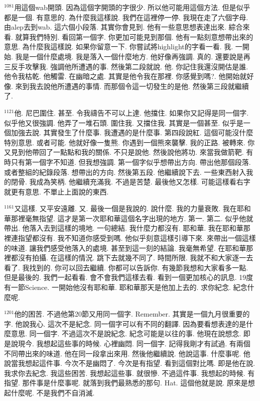 \documentclass{book}
\begin{document}
$^{1081}$用這個wab開頭.
因為這個字開頭的字很少.
所以他可能用這個方法.
但是似乎都是一個.
有意思的.
為什麼我這樣說.
我們在這裡停一停.
我現在走了六個字母.
由alep去到wab.
這六個小段落.
其實你會見到.
他有一些意思想表達出來.
綜合來看.
就算我們特別.
看回第一個字.
你更加可能見到那個.
他有一點刻意想帶出來的意思.
為什麼我這樣說.
如果你留意一下.
你嘗試將highlight的字看一看.
我.
一開始.
我是一個什麼處境.
我是落入一個什麼地方.
他好像再強調.
真的.
還要說是再三反手攻擊我.
強調他所遭遇的事.
然後第二段就說.
他.
你記住我還沒開估是誰.
他令我枯乾.
他觸雷.
在幽暗之處.
其實是他令我在那裡.
你感覺到嗎?.
他開始就好像.
來到我去說他所遭遇的事情.
而那個令這一切發生的是他.
然後第三段就繼續了.

$^{1121}$他.
尼巴圍住.
甚至.
令我禱告不可以上達.
他擋住.
如果你又記得是同一個字.
似乎他又很強調.
他弄了一堆石頭.
圍住我.
又擋住我.
其實是一個甚至.
似乎是一個加強去說.
其實發生了什麼事.
我遭遇的是什麼事.
第四段說紅.
這個可能沒什麼特別意思.
或者可能.
他就好像一隻熊.
你遇到一個熊來襲擊.
我的正路.
被轉來.
你又見到他帶回了一點點和我的關係.
不只是說他.
然後說他將功.
來當我做箭靶.
有時只有第一個字不知道.
但我想強調.
第一個字似乎想帶出方向.
帶出他那個段落.
或者整組的紀錄段落.
想帶出的方向.
然後第五段.
他繼續說下去.
一些東西射入我的閉骨.
我成為笑柄.
他繼續充滿我.
不過是苦楚.
最後他又怎樣.
可能這樣看右字就更有意思.
不單止上面說的東西.

$^{1161}$又這樣.
又平安遠離.
又.
最後一個是我說的.
說什麼.
我的力量衰敗.
我在耶和華那裡毫無指望.
這才是第一次耶和華這個名字出現的地方.
第一.
第二.
似乎他就帶出.
他落入去到這樣的境地.
一句總結.
我什麼力都沒有.
耶和華.
我在耶和華那裡連指望都沒有.
我不知道你感受到嗎.
他似乎刻意這樣引導下來.
來帶出一個這樣的味道.
讓我們感受他落入的處境.
甚至到這一刻的結論.
我毫無希望.
在耶和華那裡都沒有拍攝.
在這樣的情況.
跳下去就幾不同了.
時間所限.
我就不和大家逐一去看了.
我找到的.
你可以回去繼續.
你都可以告訴你.
有幾節我想和大家看多一點.
但是最後的.
我們一起看看.
會不會我們這樣去看.
看到一個更加核心的訊息.
19度有一節Science.
一開始他沒有耶和華.
耶和華那天是他加上去的.
求你紀念.
紀念什麼呢.

$^{1201}$他的困苦.
不過他第20節又用同一個字.
Remember.
其實是一個九月很重要的字.
他說我心.
這次不是紀念.
同一個字可以有不同的翻譯.
因為要看想表達的是什麼意思.
同一個字.
不過這次不是說紀念.
紀念可能是以往的事.
他現在說想念.
即是說現今.
我想起這些事的時候.
心裡幽悶.
同一個字.
記得我剛才有試過.
有兩個不同帶出來的味道.
他在同一段拿出來用.
然後他繼續說.
他說這事.
什麼事呢.
他說當我想起這件事.
今次不是幽悶了.
今次是有指望.
看到這個對比嗎.
即是他在說.
我求你去紀念.
我這些困苦.
我想起這些事.
就很慘.
不過這件事.
我想起的時候.
有指望.
那件事是什麼事呢.
就落到我們最熟悉的那句.
Hat.
這個他就是說.
原來是想起什麼呢.
不是我們不自消滅.
\end{document}
